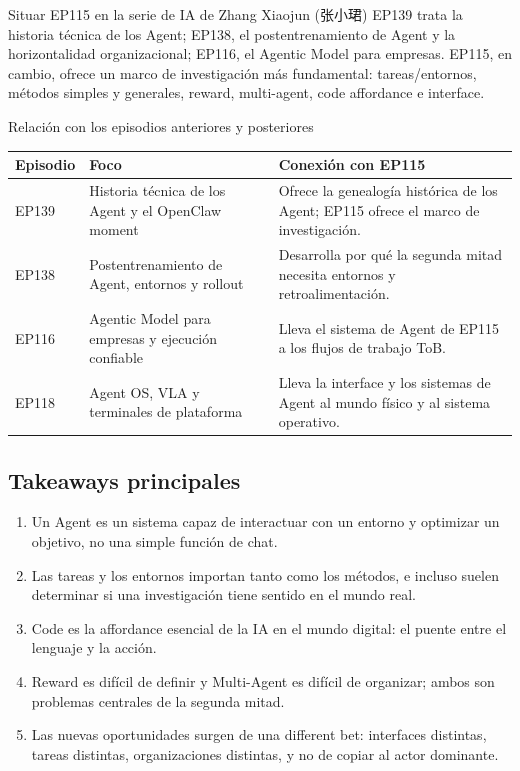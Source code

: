 \documentclass[a4paper]{article}
\begin{document}
\begin{importantbox}{Situar EP115 en la serie de IA de Zhang Xiaojun (张小珺)}
EP139 trata la historia técnica de los Agent; EP138, el postentrenamiento de Agent y la horizontalidad organizacional; EP116, el Agentic Model para empresas. EP115, en cambio, ofrece un marco de investigación más fundamental: tareas/entornos, métodos simples y generales, reward, multi-agent, code affordance e interface.
\end{importantbox}

\begin{knowledgebox}{Relación con los episodios anteriores y posteriores}
\begin{tabularx}{\textwidth}{p{}p{}X}
\toprule
Episodio & Foco & Conexión con EP115 \\
\midrule
EP139 & Historia técnica de los Agent y el OpenClaw moment & Ofrece la genealogía histórica de los Agent; EP115 ofrece el marco de investigación. \\
EP138 & Postentrenamiento de Agent, entornos y rollout & Desarrolla por qué la segunda mitad necesita entornos y retroalimentación. \\
EP116 & Agentic Model para empresas y ejecución confiable & Lleva el sistema de Agent de EP115 a los flujos de trabajo ToB. \\
EP118 & Agent OS, VLA y terminales de plataforma & Lleva la interface y los sistemas de Agent al mundo físico y al sistema operativo. \\
\bottomrule
\end{tabularx}
\end{knowledgebox}

\subsection{Takeaways principales}

\begin{enumerate}
\item Un Agent es un sistema capaz de interactuar con un entorno y optimizar un objetivo, no una simple función de chat.
\item Las tareas y los entornos importan tanto como los métodos, e incluso suelen determinar si una investigación tiene sentido en el mundo real.
\item Code es la affordance esencial de la IA en el mundo digital: el puente entre el lenguaje y la acción.
\item Reward es difícil de definir y Multi-Agent es difícil de organizar; ambos son problemas centrales de la segunda mitad.
\item Las nuevas oportunidades surgen de una different bet: interfaces distintas, tareas distintas, organizaciones distintas, y no de copiar al actor dominante.
\end{enumerate}
\end{document}
